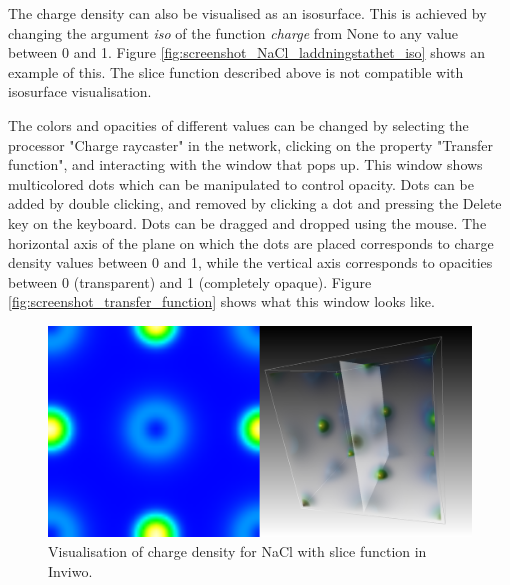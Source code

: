 \documentclass[a4paper,12pt]{article}
\begin{document}
The charge density can also be visualised as an isosurface. This is achieved by changing the argument \textit{iso} of the function \textit{charge} from None to any value between 0 and 1. Figure \ref{fig:screenshot_NaCl_laddningstathet_iso} shows an example of this. The slice function described above is not compatible with isosurface visualisation.

The colors and opacities of different values can be changed by selecting the processor "Charge raycaster" in the network, clicking on the property "Transfer function", and interacting with the window that pops up. This window shows multicolored dots which can be manipulated to control opacity. Dots can be added by double clicking, and removed by clicking a dot and pressing the Delete key on the keyboard. Dots can be dragged and dropped using the mouse. The horizontal axis of the plane on which the dots are placed corresponds to charge density values between 0 and 1, while the vertical axis corresponds to opacities between 0 (transparent) and 1 (completely opaque). Figure \ref{fig:screenshot_transfer_function} shows what this window looks like.

\begin{figure} [H]
\centering
\includegraphics[scale=0.20]{screenshot_NaCl_laddningstathetslice.png}
\caption{Visualisation of charge density for NaCl with slice function in Inviwo.}
\label{fig:screenshot_NaCl_laddningstathetslice}
\end{figure}
\end{document}
